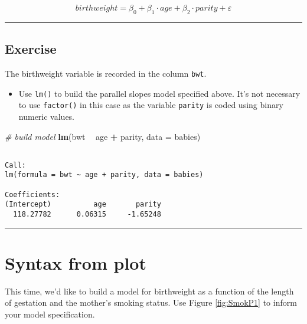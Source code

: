 \documentclass[
]{book}
\newenvironment{Shaded}{\begin{snugshade}}{\end{snugshade}}
\newcommand{\CommentTok}[1]{\textcolor[rgb]{0.56,0.35,0.01}{\textit{#1}}}
\newcommand{\DataTypeTok}[1]{\textcolor[rgb]{0.13,0.29,0.53}{#1}}
\newcommand{\KeywordTok}[1]{\textcolor[rgb]{0.13,0.29,0.53}{\textbf{#1}}}
\newcommand{\NormalTok}[1]{#1}
\newcommand{\OperatorTok}[1]{\textcolor[rgb]{0.81,0.36,0.00}{\textbf{#1}}}
\newcommand{\StringTok}[1]{\textcolor[rgb]{0.31,0.60,0.02}{#1}}
\providecommand{\tightlist}{%
  \setlength{\itemsep}{0pt}\setlength{\parskip}{0pt}}
\begin{document}
\[birthweight=\beta_0 + \beta_1 \cdot age + \beta_2 \cdot parity + \varepsilon\]

\begin{center}\rule{0.5\linewidth}{0.5pt}\end{center}

\hypertarget{exercise-2}{%
\subsection*{Exercise}\label{exercise-2}}

The birthweight variable is recorded in the column \texttt{bwt}.

\begin{itemize}
\tightlist
\item
  Use \texttt{lm()} to build the parallel slopes model specified above. It's not necessary to use \texttt{factor()} in this case as the variable \texttt{parity} is coded using binary numeric values.
\end{itemize}

\begin{Shaded}
\begin{Highlighting}[]
\CommentTok{# build model}
\KeywordTok{lm}\NormalTok{(bwt }\OperatorTok{~}\StringTok{ }\NormalTok{age }\OperatorTok{+}\StringTok{ }\NormalTok{parity, }\DataTypeTok{data =}\NormalTok{ babies)}
\end{Highlighting}
\end{Shaded}

\begin{verbatim}

Call:
lm(formula = bwt ~ age + parity, data = babies)

Coefficients:
(Intercept)          age       parity  
  118.27782      0.06315     -1.65248  
\end{verbatim}

\begin{center}\rule{0.5\linewidth}{0.5pt}\end{center}

\hypertarget{syntax-from-plot}{%
\section{Syntax from plot}\label{syntax-from-plot}}

This time, we'd like to build a model for birthweight as a function of the length of gestation and the mother's smoking status. Use Figure \ref{fig:SmokP1} to inform your model specification.
\end{document}
